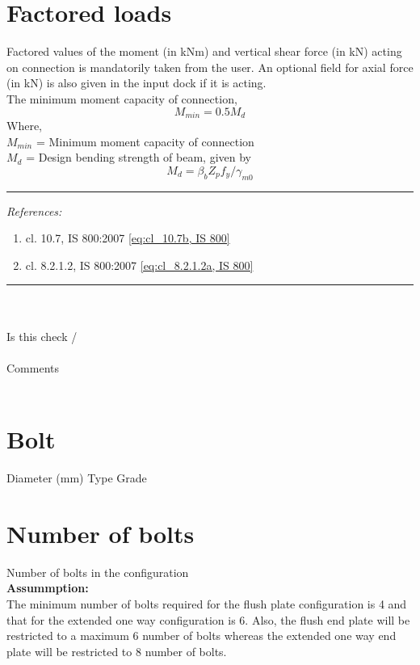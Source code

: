 \documentclass[11.5pt,a4paper,oneside]{report}
\newcommand{\okornot}{ \vspace{15mm} \hrule
	\noindent \\ \\
	Is this check \qquad
	\CheckBox[checked=False, name= ok]{\textbf{Ok}} \qquad / 
	\CheckBox[checked=False, name= notok]{\textbf{Not Ok}}\\ \\
	Comments \\ \\
	\noindent
	\TextField[name=multilinetextbox, multiline=true, width=1.0\linewidth,height=2in]{}}
\newcommand{\checkrefernces} {
	\vspace{15mm} \hrule \vspace{2mm}
	\textit{References:}}
\begin{document}
\begin{Form}
\chapter{Factored loads}
%
Factored values of the moment (in kNm) and vertical shear force  (in kN) acting on connection is mandatorily taken from the user. An optional field for axial force (in kN) is also given in the input dock if it is acting.\\
The minimum moment capacity of connection,
\begin{equation}\label{eq:cl_10.7b, IS 800}
	M_{min} = 0.5 M_d
\end{equation}
Where, \\
\indent $M_{min}$ = Minimum moment capacity of connection \\
\indent $M_d$ = Design bending strength of beam, given by
\begin{equation} \label{eq:cl_8.2.1.2a, IS 800}
M_d = \beta_b Z_p f_y / \gamma_{m0}
\end{equation}
\checkrefernces
\begin{enumerate}
	\item cl. 10.7, IS 800:2007 \eqref{eq:cl_10.7b, IS 800} 
	\item cl. 8.2.1.2, IS 800:2007 \eqref{eq:cl_8.2.1.2a, IS 800} 
\end{enumerate}
\okornot
\chapter{Bolt}
%
 Diameter (mm)
 Type
 Grade

\chapter{Number of bolts}

\large Number of bolts in the configuration \\
	
	\textbf{Assummption:} \\
	
	The minimum number of bolts required for the flush plate configuration is 4 and that for the extended one way configuration is 6. 
	Also, the flush end plate will be restricted to a maximum 6 number of bolts whereas the extended one way end plate will be restricted to 8 number of bolts.
	

\end{Form}
\end{document}
